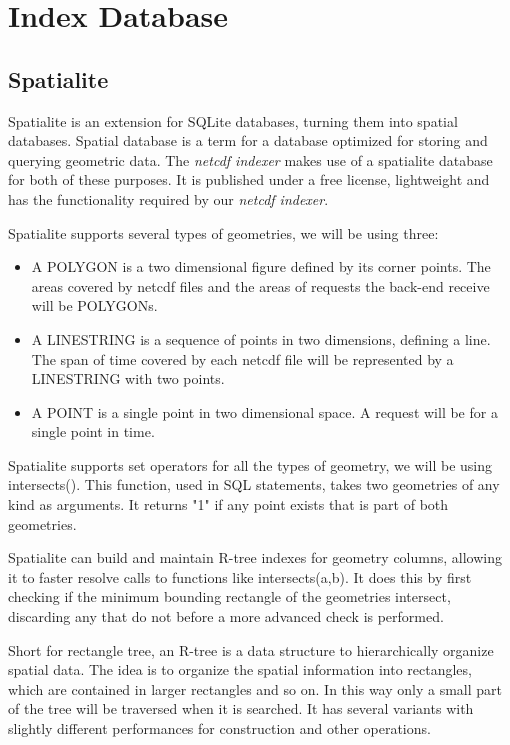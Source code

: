\documentclass[11pt,a4paper,titlepage,oneside]{report}
\begin{document}
\section{Index Database}
  \subsection{Spatialite}
  Spatialite is an extension for SQLite databases, turning them into spatial databases. Spatial database is a term for a database optimized for storing and querying geometric data. The \textit{\gls{netcdf} indexer} makes use of a spatialite database for both of these purposes. It is published under a free license, lightweight and has the functionality required by our \textit{\gls{netcdf} indexer}.
  
  Spatialite supports several types of geometries, we will be using three:
  \begin{itemize}
\item A POLYGON is a two dimensional figure defined by its corner points. The areas covered by \gls{netcdf} files and the areas of requests the back-end receive will be POLYGONs.
\item A LINESTRING is a sequence of points in two dimensions, defining a line. The span of time covered by each \gls{netcdf} file will be represented by a LINESTRING with two points.
\item A POINT is a single point in two dimensional space. A request will be for a single point in time.
\end{itemize}

  Spatialite supports set operators for all the types of geometry, we will be using intersects(). This function, used in SQL statements, takes two geometries of any kind as arguments. It returns "1" if any point exists that is part of both geometries.

  Spatialite can build and maintain R-tree indexes for geometry columns, allowing it to faster resolve calls to functions like intersects(a,b). It does this by first checking if the minimum bounding rectangle of the geometries intersect, discarding any that do not before a more advanced check is performed.
  
  Short for rectangle tree, an R-tree is a data structure to hierarchically organize spatial data. The idea is to organize the spatial information into rectangles, which are contained in larger rectangles and so on. In this way only a small part of the tree will be traversed when it is searched.  It has several variants with slightly different performances for construction and other operations.
\end{document}
